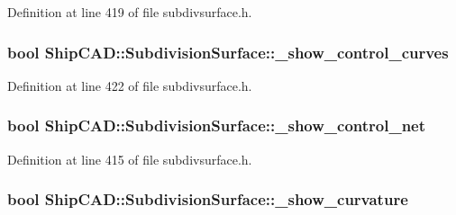 Definition at line 419 of file subdivsurface.\+h.

\subsubsection[{\texorpdfstring{\+\_\+show\+\_\+control\+\_\+curves}{_show_control_curves}}]{\setlength{\rightskip}{0pt plus 5cm}bool Ship\+C\+A\+D\+::\+Subdivision\+Surface\+::\+\_\+show\+\_\+control\+\_\+curves\hspace{0.3cm}{\ttfamily [protected]}}\hypertarget{classShipCAD_1_1SubdivisionSurface_ae240b2177e0af0bd1512c94b524f22dd}{}\label{classShipCAD_1_1SubdivisionSurface_ae240b2177e0af0bd1512c94b524f22dd}


Definition at line 422 of file subdivsurface.\+h.

\subsubsection[{\texorpdfstring{\+\_\+show\+\_\+control\+\_\+net}{_show_control_net}}]{\setlength{\rightskip}{0pt plus 5cm}bool Ship\+C\+A\+D\+::\+Subdivision\+Surface\+::\+\_\+show\+\_\+control\+\_\+net\hspace{0.3cm}{\ttfamily [protected]}}\hypertarget{classShipCAD_1_1SubdivisionSurface_ab9bb374cf1368b4a2c779f953bca88a8}{}\label{classShipCAD_1_1SubdivisionSurface_ab9bb374cf1368b4a2c779f953bca88a8}


Definition at line 415 of file subdivsurface.\+h.

\subsubsection[{\texorpdfstring{\+\_\+show\+\_\+curvature}{_show_curvature}}]{\setlength{\rightskip}{0pt plus 5cm}bool Ship\+C\+A\+D\+::\+Subdivision\+Surface\+::\+\_\+show\+\_\+curvature\hspace{0.3cm}{\ttfamily [protected]}}\hypertarget{classShipCAD_1_1SubdivisionSurface_abe2167085eac50c986b074635b610462}{}\label{classShipCAD_1_1SubdivisionSurface_abe2167085eac50c986b074635b610462}


